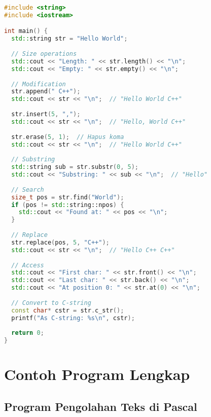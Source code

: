\documentclass[../main.tex]{subfiles}
\begin{document}
\begin{lstlisting}[language=C++, caption={Contoh metode std::string}]
#include <string>
#include <iostream>

int main() {
  std::string str = "Hello World";
  
  // Size operations
  std::cout << "Length: " << str.length() << "\n";
  std::cout << "Empty: " << str.empty() << "\n";
  
  // Modification
  str.append(" C++");
  std::cout << str << "\n";  // "Hello World C++"
  
  str.insert(5, ",");
  std::cout << str << "\n";  // "Hello, World C++"
  
  str.erase(5, 1);  // Hapus koma
  std::cout << str << "\n";  // "Hello World C++"
  
  // Substring
  std::string sub = str.substr(0, 5);
  std::cout << "Substring: " << sub << "\n";  // "Hello"
  
  // Search
  size_t pos = str.find("World");
  if (pos != std::string::npos) {
    std::cout << "Found at: " << pos << "\n";
  }
  
  // Replace
  str.replace(pos, 5, "C++");
  std::cout << str << "\n";  // "Hello C++ C++"
  
  // Access
  std::cout << "First char: " << str.front() << "\n";
  std::cout << "Last char: " << str.back() << "\n";
  std::cout << "At position 0: " << str.at(0) << "\n";
  
  // Convert to C-string
  const char* cstr = str.c_str();
  printf("As C-string: %s\n", cstr);
  
  return 0;
}
\end{lstlisting}

\section{Contoh Program Lengkap}

\subsection{Program Pengolahan Teks di Pascal}
\end{document}

